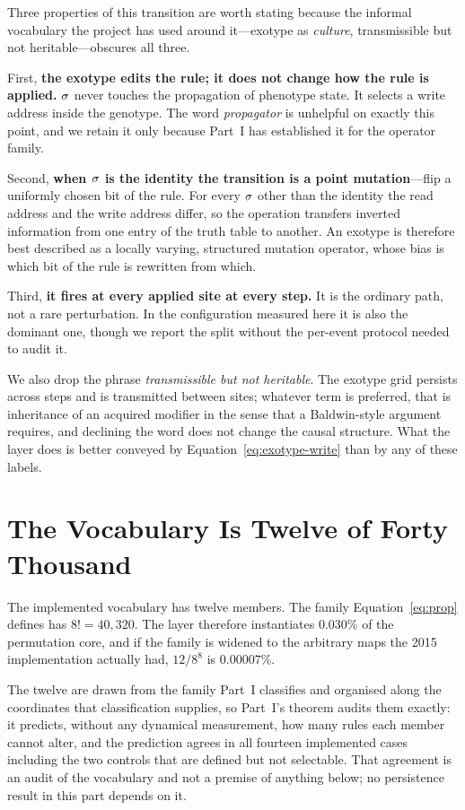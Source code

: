 Three properties of this transition are worth stating because the informal
vocabulary the project has used around it---exotype as \emph{culture},
transmissible but not heritable---obscures all three.

First, \textbf{the exotype edits the rule; it does not change how the rule is
applied.} $\sigma$ never touches the propagation of phenotype state. It selects a
write address inside the genotype. The word \emph{propagator} is unhelpful on
exactly this point, and we retain it only because Part~I has established it for
the operator family.

Second, \textbf{when $\sigma$ is the identity the transition is a point
mutation}---flip a uniformly chosen bit of the rule. For every $\sigma$ other than
the identity the read address and the write address differ, so the operation
transfers inverted information from one entry of the truth table to another.
An exotype is therefore best described as a locally varying, structured mutation
operator, whose bias is which bit of the rule is rewritten from which.

Third, \textbf{it fires at every applied site at every step.} It is the ordinary
path, not a rare perturbation. In the configuration measured here it is also the
dominant one, though we report the split without the per-event protocol needed to audit
it.

We also drop the phrase \emph{transmissible but not heritable}. The exotype grid
persists across steps and is transmitted between sites; whatever term is
preferred, that is inheritance of an acquired modifier in the sense that a
Baldwin-style argument requires, and declining the word does not change the
causal structure. What the layer does is better conveyed by
Equation~\eqref{eq:exotype-write} than by any of these labels.

\section{The Vocabulary Is Twelve of Forty Thousand}
\label{sec:exotype-vocabulary}

The implemented vocabulary has twelve members. The family
Equation~\eqref{eq:prop} defines has $8! = 40{,}320$. The layer therefore
instantiates $0.030\%$ of the permutation core, and if the family is widened to
the arbitrary maps the 2015 implementation actually had, $12/8^8$ is
$0.00007\%$.

The twelve are drawn from the family Part~I classifies and organised along the
coordinates that classification supplies, so Part~I's theorem audits them exactly: it
predicts, without any dynamical measurement, how many rules each member cannot alter,
and the prediction agrees in all fourteen implemented cases including the two controls
that are defined but not selectable. That agreement is an audit of the vocabulary and
not a premise of anything below; no persistence result in this part depends on it.

